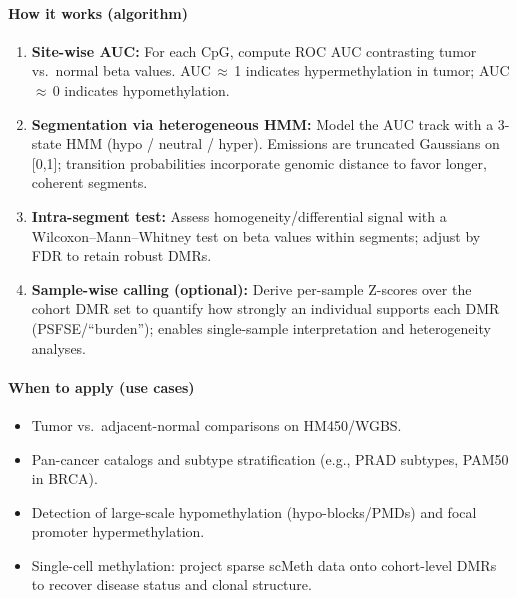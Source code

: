 \documentclass[10pt]{extarticle}
\begin{document}
\paragraph{How it works (algorithm)}
\begin{enumerate}
  \item \textbf{Site-wise AUC:} For each CpG, compute ROC AUC contrasting tumor vs.\ normal beta values. AUC\,$\approx$\,1 indicates hypermethylation in tumor; AUC\,$\approx$\,0 indicates hypomethylation.
  \item \textbf{Segmentation via heterogeneous HMM:} Model the AUC track with a 3-state HMM (hypo / neutral / hyper). Emissions are truncated Gaussians on [0,1]; transition probabilities incorporate genomic distance to favor longer, coherent segments.
  \item \textbf{Intra-segment test:} Assess homogeneity/differential signal with a Wilcoxon–Mann–Whitney test on beta values within segments; adjust by FDR to retain robust DMRs.
  \item \textbf{Sample-wise calling (optional):} Derive per-sample Z-scores over the cohort DMR set to quantify how strongly an individual supports each DMR (PSFSE/``burden''); enables single-sample interpretation and heterogeneity analyses.
\end{enumerate}

\paragraph{When to apply (use cases)}
\begin{itemize}[label=-]
  \item Tumor vs.\ adjacent-normal comparisons on HM450/WGBS.
  \item Pan-cancer catalogs and subtype stratification (e.g., PRAD subtypes, PAM50 in BRCA).
  \item Detection of large-scale hypomethylation (hypo-blocks/PMDs) and focal promoter hypermethylation.
  \item Single-cell methylation: project sparse scMeth data onto cohort-level DMRs to recover disease status and clonal structure.
\end{itemize}
\end{document}
